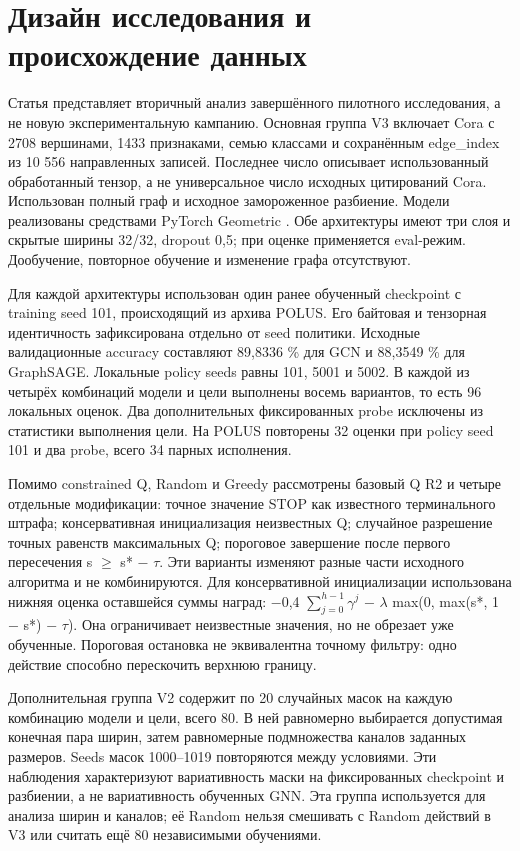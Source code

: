 \documentclass[10pt,a4paper]{article}
\begin{document}
\section*{Дизайн исследования и происхождение данных}
Статья представляет вторичный анализ завершённого пилотного исследования, а не новую экспериментальную кампанию. Основная группа V3 включает Cora с 2708 вершинами, 1433 признаками, семью классами и сохранённым edge\_index из 10 556 направленных записей. Последнее число описывает использованный обработанный тензор, а не универсальное число исходных цитирований Cora. Использован полный граф и исходное замороженное разбиение. Модели реализованы средствами PyTorch Geometric \cite{r14}. Обе архитектуры имеют три слоя и скрытые ширины 32/32, dropout 0,5; при оценке применяется eval-режим. Дообучение, повторное обучение и изменение графа отсутствуют.

Для каждой архитектуры использован один ранее обученный checkpoint с training seed 101, происходящий из архива POLUS. Его байтовая и тензорная идентичность зафиксирована отдельно от seed политики. Исходные валидационные accuracy составляют 89,8336 \% для GCN и 88,3549 \% для GraphSAGE. Локальные policy seeds равны 101, 5001 и 5002. В каждой из четырёх комбинаций модели и цели выполнены восемь вариантов, то есть 96 локальных оценок. Два дополнительных фиксированных probe исключены из статистики выполнения цели. На POLUS повторены 32 оценки при policy seed 101 и два probe, всего 34 парных исполнения.

Помимо constrained Q, Random и Greedy рассмотрены базовый Q R2 и четыре отдельные модификации: точное значение STOP как известного терминального штрафа; консервативная инициализация неизвестных Q; случайное разрешение точных равенств максимальных Q; пороговое завершение после первого пересечения s $\geq$ s* $-$ $\tau$. Эти варианты изменяют разные части исходного алгоритма и не комбинируются. Для консервативной инициализации использована нижняя оценка оставшейся суммы наград: $-$0,4 $\sum_{j=0}^{h-1}\gamma^j$ $-$ $\lambda$ max(0, max(s*, 1 $-$ s*) $-$ $\tau$). Она ограничивает неизвестные значения, но не обрезает уже обученные. Пороговая остановка не эквивалентна точному фильтру: одно действие способно перескочить верхнюю границу.

Дополнительная группа V2 содержит по 20 случайных масок на каждую комбинацию модели и цели, всего 80. В ней равномерно выбирается допустимая конечная пара ширин, затем равномерные подмножества каналов заданных размеров. Seeds масок 1000–1019 повторяются между условиями. Эти наблюдения характеризуют вариативность маски на фиксированных checkpoint и разбиении, а не вариативность обученных GNN. Эта группа используется для анализа ширин и каналов; её Random нельзя смешивать с Random действий в V3 или считать ещё 80 независимыми обучениями.
\end{document}

